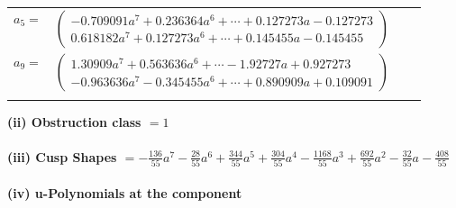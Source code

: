 \documentclass[1p]{elsarticle_modified}
\theoremstyle{definition}
\begin{document}
\begin{tabular}{m{7pt} m{180pt} m{7pt} m{180pt} }
\flushright $a_{5}=$&$\begin{pmatrix}-0.709091 a^{7}+0.236364 a^{6}+\cdots+0.127273 a-0.127273\\0.618182 a^{7}+0.127273 a^{6}+\cdots+0.145455 a-0.145455\end{pmatrix}$ \\
\flushright $a_{9}=$&$\begin{pmatrix}1.30909 a^{7}+0.563636 a^{6}+\cdots-1.92727 a+0.927273\\-0.963636 a^{7}-0.345455 a^{6}+\cdots+0.890909 a+0.109091\end{pmatrix}$\\&\end{tabular}
\flushleft \textbf{(ii) Obstruction class $= 1$}\\~\\
\flushleft \textbf{(iii) Cusp Shapes $= -\frac{136}{55} a^7-\frac{28}{55} a^6+\frac{344}{55} a^5+\frac{304}{55} a^4-\frac{1168}{55} a^3+\frac{692}{55} a^2-\frac{32}{55} a-\frac{408}{55}$}\\~\\
\newpage\renewcommand{\arraystretch}{1}
\flushleft \textbf{(iv) u-Polynomials at the component}\newline \\
\end{document}
